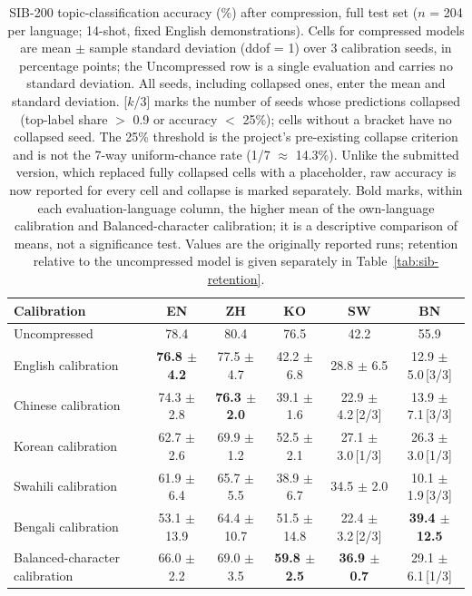 \begin{table}[t]
\centering
\small
\begin{tabular}{lccccc}
\toprule
Calibration & EN & ZH & KO & SW & BN \\
\midrule
Uncompressed & 78.4 & 80.4 & 76.5 & 42.2 & 55.9 \\
\midrule
English calibration & \textbf{76.8 $\pm$ 4.2} & 77.5 $\pm$ 4.7 & 42.2 $\pm$ 6.8 & 28.8 $\pm$ 6.5 & 12.9 $\pm$ 5.0\,[3/3] \\
Chinese calibration & 74.3 $\pm$ 2.8 & \textbf{76.3 $\pm$ 2.0} & 39.1 $\pm$ 1.6 & 22.9 $\pm$ 4.2\,[2/3] & 13.9 $\pm$ 7.1\,[3/3] \\
Korean calibration & 62.7 $\pm$ 2.6 & 69.9 $\pm$ 1.2 & 52.5 $\pm$ 2.1 & 27.1 $\pm$ 3.0\,[1/3] & 26.3 $\pm$ 3.0\,[1/3] \\
Swahili calibration & 61.9 $\pm$ 6.4 & 65.7 $\pm$ 5.5 & 38.9 $\pm$ 6.7 & 34.5 $\pm$ 2.0 & 10.1 $\pm$ 1.9\,[3/3] \\
Bengali calibration & 53.1 $\pm$ 13.9 & 64.4 $\pm$ 10.7 & 51.5 $\pm$ 14.8 & 22.4 $\pm$ 3.2\,[2/3] & \textbf{39.4 $\pm$ 12.5} \\
Balanced-character calibration & 66.0 $\pm$ 2.2 & 69.0 $\pm$ 3.5 & \textbf{59.8 $\pm$ 2.5} & \textbf{36.9 $\pm$ 0.7} & 29.1 $\pm$ 6.1\,[1/3] \\
\bottomrule
\end{tabular}
\caption{SIB-200 topic-classification accuracy (\%) after compression, full test set ($n$ = 204 per language; 14-shot, fixed English demonstrations). Cells for compressed models are mean $\pm$ sample standard deviation (ddof = 1) over 3 calibration seeds, in percentage points; the Uncompressed row is a single evaluation and carries no standard deviation. All seeds, including collapsed ones, enter the mean and standard deviation. [$k$/3] marks the number of seeds whose predictions collapsed (top-label share $>$ 0.9 or accuracy $<$ 25\%); cells without a bracket have no collapsed seed. The 25\% threshold is the project's pre-existing collapse criterion and is not the 7-way uniform-chance rate (1/7 $\approx$ 14.3\%). Unlike the submitted version, which replaced fully collapsed cells with a placeholder, raw accuracy is now reported for every cell and collapse is marked separately. Bold marks, within each evaluation-language column, the higher mean of the own-language calibration and Balanced-character calibration; it is a descriptive comparison of means, not a significance test. Values are the originally reported runs; retention relative to the uncompressed model is given separately in Table~\ref{tab:sib-retention}.}
\label{tab:sib-acc-full}
\end{table}
